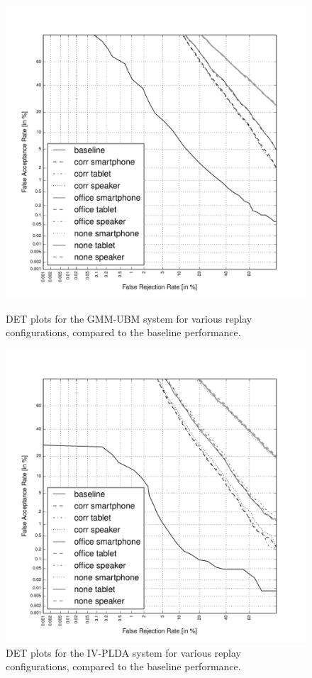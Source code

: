 \begin{figure}
	\centering
	\begin{minipage}{.5\textwidth}
	\includegraphics[width=1\linewidth]{Figs/DETs_GMM.pdf}
	\caption{DET plots for the GMM-UBM system for various replay configurations, compared to the baseline performance.}
	\label{fig::DETs_replay_GMM}
	\end{minipage}
	\begin{minipage}{.5\textwidth}
	\includegraphics[width=1\linewidth]{Figs/DETs_IV.pdf}
	\caption{DET plots for the IV-PLDA system for various replay configurations, compared to the baseline performance.}
	\label{fig::DETs_replay_IV}
	\end{minipage}


\end{figure}



